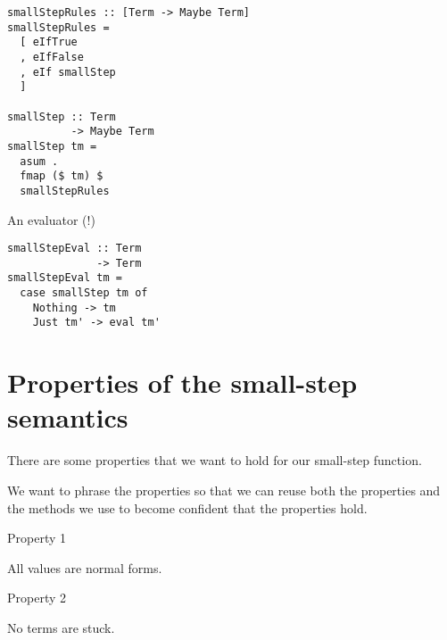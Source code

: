\documentclass{beamer}
\begin{document}
\begin{frame}[fragile]
 \begin{verbatim}
smallStepRules :: [Term -> Maybe Term]
smallStepRules =
  [ eIfTrue
  , eIfFalse
  , eIf smallStep
  ]

smallStep :: Term 
          -> Maybe Term
smallStep tm =
  asum .
  fmap ($ tm) $
  smallStepRules
 \end{verbatim}
\end{frame}

\begin{frame}[fragile]
  \begin{center}
An evaluator (!)
  \end{center}
 \begin{verbatim}
smallStepEval :: Term 
              -> Term
smallStepEval tm =
  case smallStep tm of
    Nothing -> tm
    Just tm' -> eval tm'
 \end{verbatim}
\end{frame}

\section{Properties of the small-step semantics}

\begin{frame}[c]
  \begin{center}
There are some properties that we want to hold for our small-step function.
  \end{center}
\end{frame}

\begin{frame}[c]
  \begin{center}
We want to phrase the properties so that we can reuse both the properties and
the methods we use to become confident that the properties hold.
  \end{center}
\end{frame}

\begin{frame}[c]
  Property 1
  \begin{center}
All values are normal forms.
  \end{center}
\end{frame}

\begin{frame}[c]
  Property 2
  \begin{center}
No terms are stuck.
  \end{center}
\end{frame}
\end{document}
